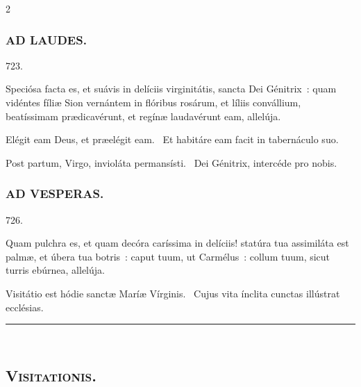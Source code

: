 \documentclass[9pt,twoside]{extarticle}
\begin{document}
\begin{multicols}{2}
\subsubsection*{\center \textsc{AD LAUDES.}}
\begin{tightlist}{}
\item {} 723.
\item {} Speciósa facta es, et suávis in delíciis virginitátis, sancta Dei Génitrix~: quam vidéntes fíliæ Sion vernántem in flóribus rosárum, et líliis convállium, beatíssimam prædicavérunt, et regínæ laudavérunt eam, allelúja.
\item {} Elégit eam Deus, et præelégit eam. ~Et habitáre eam facit in tabernáculo suo.
\item {} Post partum, Virgo, invioláta permansísti. ~Dei Génitrix, intercéde pro nobis.
\item {}
\end{tightlist}

\subsubsection*{\center \textsc{AD VESPERAS.}}
\begin{tightlist}{}
\item {} 726.
\item {} Quam pulchra es, et quam decóra caríssima in delíciis! statúra tua assimiláta est palmæ, et úbera tua botris~: caput tuum, ut Carmélus~: collum tuum, sicut turris ebúrnea, allelúja.
\item {} Visitátio est hódie sanctæ Maríæ Vírginis. ~Cujus vita ínclita cunctas illústrat ecclésias.
\item {}
\end{tightlist}

\begin{center}\textcolor{red}{\rule{\linewidth}{0.5pt}} \end{center}

\subsection*{\center \textsc{\\
Visitationis.}}

\end{multicols}
\end{document}

